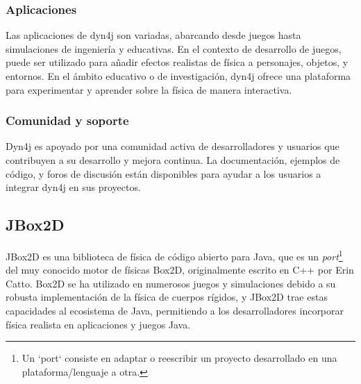 \subsubsection{Aplicaciones}
Las aplicaciones de dyn4j son variadas, abarcando desde juegos hasta simulaciones de ingeniería y educativas. En el contexto de desarrollo de juegos, puede ser utilizado para añadir efectos realistas de física a personajes, objetos, y entornos. En el ámbito educativo o de investigación, dyn4j ofrece una plataforma para experimentar y aprender sobre la física de manera interactiva.
\subsubsection{Comunidad y soporte}
Dyn4j es apoyado por una comunidad activa de desarrolladores y usuarios que contribuyen a su desarrollo y mejora continua. La documentación, ejemplos de código, y foros de discusión están disponibles para ayudar a los usuarios a integrar dyn4j en sus proyectos.

\subsection{JBox2D}\cite{JBox2D}

JBox2D es una biblioteca de física de código abierto para Java, que es un \textit{port}\footnote{Un `port` consiste en adaptar o reescribir un proyecto desarrollado en una plataforma/lenguaje a otra.} del muy conocido motor de físicas Box2D, originalmente escrito en C++ por Erin Catto. Box2D se ha utilizado en numerosos juegos y simulaciones debido a su robusta implementación de la física de cuerpos rígidos, y JBox2D trae estas capacidades al ecosistema de Java, permitiendo a los desarrolladores incorporar física realista en aplicaciones y juegos Java.

